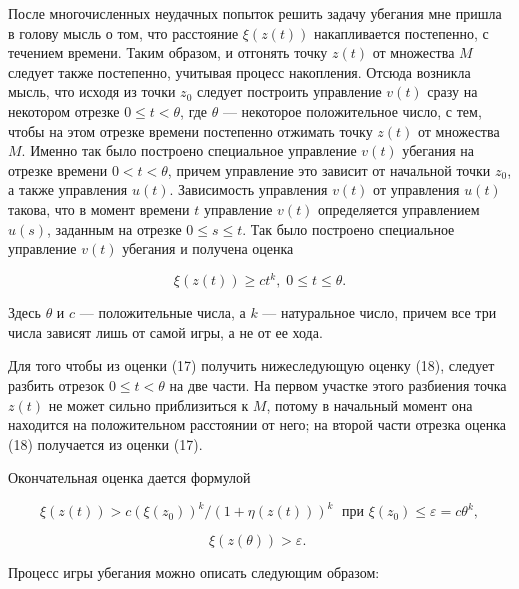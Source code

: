 \documentclass[10pt]{article}
\begin{document}
После многочисленных неудачных попыток решить задачу убегания мне пришла в голову мысль о том, что расстояние \(\xi \left(z\left(t\right)\right)\) накапливается постепенно, с течением времени. Таким образом, и отгонять точку \(z\left(t\right)\) от множества \(M\) следует также постепенно, учитывая процесс накопления. Отсюда возникла мысль, что исходя из точки \({z}_{0}\) следует построить управление \(v\left( t\right)\) сразу на некотором отрезке \(0 \leq t < \theta\), где \(\theta\) — некоторое положительное число, с тем, чтобы на этом отрезке времени постепенно отжимать точку \(z\left(t\right)\) от множества \(M\). Именно так было построено специальное управление \(v\left( t\right)\) убегания на отрезке времени \(0 < t < \theta\), причем управление это зависит от начальной точки \({z}_{0}\), а также управления \(u\left( t\right)\). Зависимость управления \(v\left( t\right)\) от управления \(u\left( t\right)\) такова, что в момент времени \(t\) управление \(v\left( t\right)\) определяется управлением \(u\left( s\right)\), заданным на отрезке \(0 \leq  s \leq  t\). Так было построено специальное управление \(v\left( t\right)\) убегания и получена оценка

\[
\xi \left( {z\left( t\right) }\right)  \geq  c{t}^{k},\;0 \leq  t \leq  \theta. \tag{17}
\]

Здесь \(\theta\) и \(c\) — положительные числа, а \(k\) — натуральное число, причем все три числа зависят лишь от самой игры, а не от ее хода.

Для того чтобы из оценки (17) получить нижеследующую оценку (18), следует разбить отрезок \(0 \leq t < \theta\) на две части. На первом участке этого разбиения точка \(z\left( t\right)\) не может сильно приблизиться к \(M\), потому в начальный момент она находится на положительном расстоянии от него; на второй части отрезка оценка (18) получается из оценки (17).

Окончательная оценка дается формулой

\[
\xi \left( {z\left( t\right) }\right)  > c{\left( \xi \left( {z}_{0}\right) \right) }^{k}/{\left( 1 + \eta \left( z\left( t\right) \right) \right) }^{k}\;\text{ при }\xi \left( {z}_{0}\right)  \leq  \varepsilon  = c{\theta }^{k}, \tag{18}
\]

\[
\xi \left( {z\left( \theta \right) }\right)  > \varepsilon \text{. } \tag{19}
\]

Процесс игры убегания можно описать следующим образом:
\end{document}

